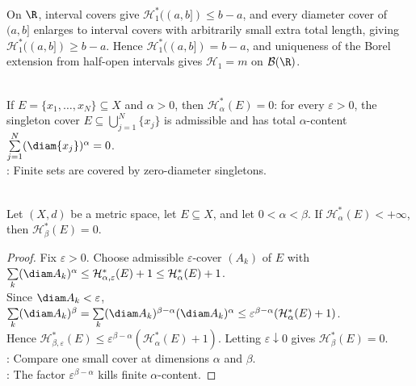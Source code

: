 \begin{remark} \label{rem:hausdorff-one-dimensional-calibration} \\
On $\R$, interval covers give $\mathcal{H}_1^\ast((a,b])\leq b-a$, and every diameter cover of $(a,b]$ enlarges to interval covers with arbitrarily small extra total length, giving $\mathcal{H}_1^\ast((a,b])\geq b-a$. Hence $\mathcal{H}_1^\ast((a,b])=b-a$, and uniqueness of the Borel extension from half-open intervals gives $\mathcal{H}_1=m$ on $\mathcal{B}(\R)$.
\end{remark}

\begin{example} \label{ex:hausdorff-measure-finite-sets} \\
If $E=\{x_1,\ldots,x_N\}\subseteq X$ and $\alpha>0$, then $\mathcal{H}_\alpha^\ast(E)=0$: for every $\varepsilon>0$, the singleton cover $E\subseteq\bigcup\limits_{j=1}^{N}\{x_j\}$ is admissible and has total $\alpha$-content $\sum\limits_{j=1}^{N}(\diam\{x_j\})^\alpha=0$.\\
: Finite sets are covered by zero-diameter singletons.
\end{example}

\begin{proposition} \label{prop:hausdorff-measure-critical-exponent} \\
Let $(X,d)$ be a metric space, let $E\subseteq X$, and let $0<\alpha<\beta$. If $\mathcal{H}_\alpha^\ast(E)<+\infty$, then $\mathcal{H}_\beta^\ast(E)=0$.
\begin{proof} Fix $\varepsilon>0$. Choose admissible $\varepsilon$-cover $(A_k)$ of $E$ with $\sum\limits_k(\diam A_k)^\alpha\leq\mathcal{H}_{\alpha,\varepsilon}^\ast(E)+1\leq\mathcal{H}_\alpha^\ast(E)+1$.\\
Since $\diam A_k<\varepsilon$, $\sum\limits_k(\diam A_k)^\beta=\sum\limits_k(\diam A_k)^{\beta-\alpha}(\diam A_k)^\alpha\leq\varepsilon^{\beta-\alpha}(\mathcal{H}_\alpha^\ast(E)+1)$.\\
Hence $\mathcal{H}_{\beta,\varepsilon}^\ast(E)\leq\varepsilon^{\beta-\alpha}(\mathcal{H}_\alpha^\ast(E)+1)$. Letting $\varepsilon\downarrow0$ gives $\mathcal{H}_\beta^\ast(E)=0$.\\
: Compare one small cover at dimensions $\alpha$ and $\beta$.\\
: The factor $\varepsilon^{\beta-\alpha}$ kills finite $\alpha$-content.
\end{proof}
\end{proposition}

